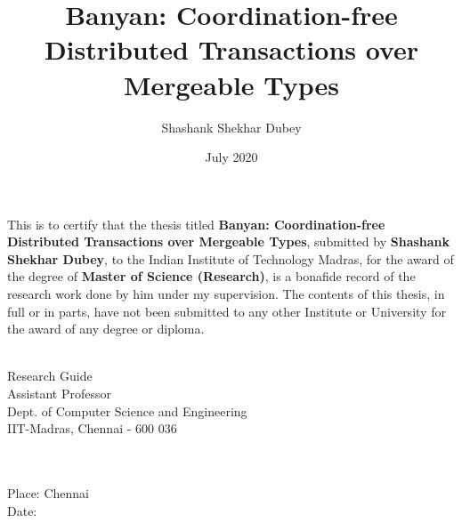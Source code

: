 \documentclass[MS]{iitmdiss}
\newcommand{\clearemptydoublepage}{\newpage{\cleardoublepage}}
\begin{document}

\title{Banyan: Coordination-free Distributed Transactions over Mergeable Types}

\author{Shashank Shekhar Dubey}

\date{July 2020}

\maketitle



\clearemptydoublepage
\certificate

\vspace*{0.5in}

\noindent This is to certify that the thesis titled {\bf Banyan: Coordination-free Distributed Transactions over Mergeable Types}, submitted by {\bf Shashank Shekhar Dubey}, to the Indian Institute of Technology Madras, for the award of the degree of {\bf Master of Science (Research)}, is a bonafide
record of the research work done by him under my supervision. The contents of this thesis, in full or in parts, have not been submitted to any other Institute or University for the award of any degree or diploma.

\vspace*{1.5in}

\begin{singlespacing}
	 \\
	\noindent Research Guide \\ 
	\noindent Assistant Professor \\
	\noindent Dept. of Computer Science and Engineering\\
	\noindent IIT-Madras, Chennai - 600 036 \\
\end{singlespacing}
\\
\\
\noindent Place: Chennai\\
Date: 


\clearemptydoublepage
\acknowledgements

\end{document}
